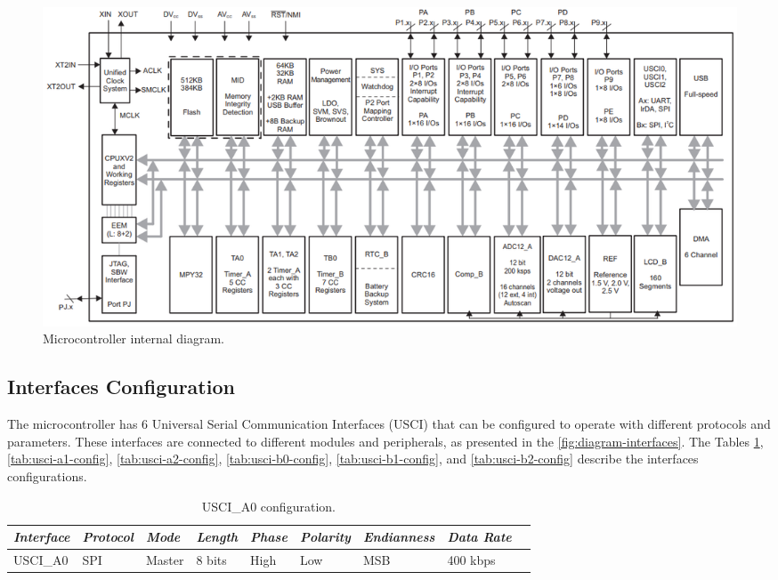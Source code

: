 \begin{figure}[!ht]
    \begin{center}
        \includegraphics[width=\textwidth]{figures/msp430-diagram.png}
        \caption{Microcontroller internal diagram.}
        \label{fig:msp430-diagram}
    \end{center}
\end{figure}

\subsection{Interfaces Configuration}

The microcontroller has 6 Universal Serial Communication Interfaces (USCI) that can be configured to operate with different protocols and parameters. These interfaces are connected to different modules and peripherals, as presented in the \autoref{fig:diagram-interfaces}. The Tables \ref{tab:usci-a0-config}, \ref{tab:usci-a1-config}, \ref{tab:usci-a2-config}, \ref{tab:usci-b0-config}, \ref{tab:usci-b1-config}, and \ref{tab:usci-b2-config} describe the interfaces configurations.

\begin{table}[!h]
    \centering
    \begin{tabular}{lllllllll}
        \toprule[1.5pt]
        \textit{Interface} & \textit{Protocol} & \textit{Mode} & \textit{Length} & \textit{Phase} & \textit{Polarity} & \textit{Endianness} & \textit{Data Rate} \\
        \midrule
        USCI\_A0           & SPI               & Master        & 8 bits          & High           & Low               & MSB                 & 400 kbps  \\
        \bottomrule[1.5pt]
    \end{tabular}
    \caption{USCI\_A0 configuration.}
    \label{tab:usci-a0-config}
\end{table}

